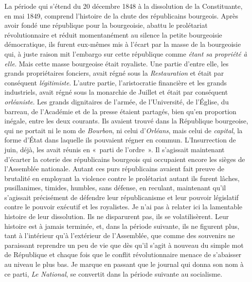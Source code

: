 \documentclass[french,twoside]{book} %
\begin{document}
La période qui s’étend du 20 décembre 1848 à la dissolution de la Constituante, en mai 1849, comprend l’histoire de la chute des républicains bourgeois. Après avoir fondé une république pour la bourgeoisie, abattu le prolétariat révolutionnaire et réduit momentanément au silence la petite bourgeoisie démocratique, ils furent eux-mêmes mis à l’écart par la masse de la bourgeoisie qui, à juste raison mit l’embargo sur cette république comme \emph{étant sa propriété à elle}. Mais cette masse bourgeoise était royaliste. Une partie d’entre elle, les grands propriétaires fonciers, avait régné sous la \emph{Restauration} et était par conséquent \emph{légitimiste}. L’autre partie, l’aristocratie financière et les grands industriels, avait régné sous la monarchie de Juillet et était par conséquent \emph{orléaniste}. Les grands dignitaires de l’armée, de l’Université, de l’Église, du barreau, de l’Académie et de la presse étaient partagés, bien qu’en proportion inégale, entre les deux courants. Ils avaient trouvé dans la République bourgeoise, qui ne portait ni le nom de \emph{Bourbon}, ni celui d’\emph{Orléans}, mais celui de \emph{capital}, la forme d’État dans laquelle ils pouvaient régner en commun. L’Insurrection de juin, déjà, les avait réunis en « parti de l’ordre ». Il s’agissait maintenant d’écarter la coterie des républicains bourgeois qui occupaient encore les sièges de l’Assemblée nationale. Autant ces purs républicains avaient fait preuve de brutalité en employant la violence contre le prolétariat autant ils furent lâches, pusillanimes, timides, humbles, sans défense, en reculant, maintenant qu’il s’agissait précisément de défendre leur républicanisme et leur pouvoir législatif contre le pouvoir exécutif et les royalistes. Je n’ai pas à relater ici la lamentable histoire de leur dissolution. Ils ne disparurent pas, ils se volatilisèrent. Leur histoire est à jamais terminée, et, dans la période suivante, ils ne figurent plus, tant à l’intérieur qu’à l’extérieur de l’Assemblée, que comme des souvenirs ne paraissant reprendre un peu de vie que dès qu’il s’agit à nouveau du simple mot de République et chaque fois que le conflit révolutionnaire menace de s’abaisser au niveau le plus bas. Je marque en passant que le journal qui donna son nom à ce parti, \emph{Le National}, se convertit dans la période suivante au socialisme.\par
\end{document}
